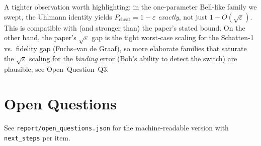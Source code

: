 \documentclass[11pt]{article}
\begin{document}
\bigskip
\noindent A tighter observation worth highlighting: in the one-parameter
Bell-like family we swept, the Uhlmann identity yields
$P_\mathrm{cheat}=1-\varepsilon$ \emph{exactly}, not just
$1-O(\sqrt{\varepsilon})$.  This is compatible with (and stronger than) the
paper's stated bound.  On the other hand, the paper's $\sqrt{\varepsilon}$
gap is the tight worst-case scaling for the Schatten-1 vs.\ fidelity
gap (Fuchs--van de Graaf), so more elaborate families that saturate the
$\sqrt{\varepsilon}$ scaling for the \emph{binding} error (Bob's ability
to detect the switch) are plausible; see Open~Question~Q3.

\section{Open Questions}
See \texttt{report/open\_questions.json} for the machine-readable version
with \texttt{next\_steps} per item.
\end{document}
